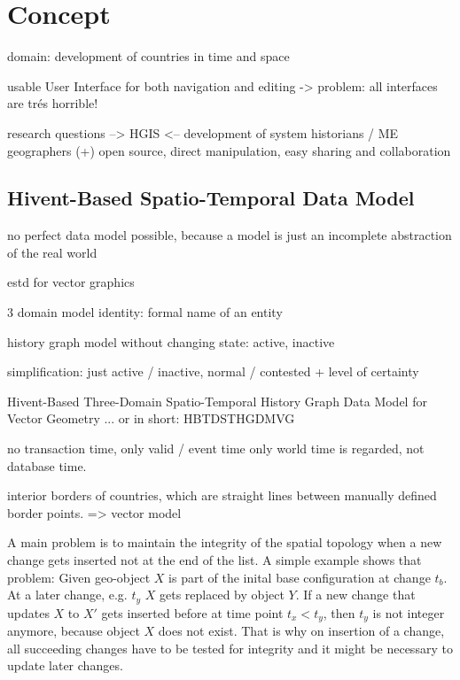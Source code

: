 
\chapter{Concept} %
\label{cha:concept}

domain: development of countries in time and space

usable User Interface for both navigation and editing
-> problem: all interfaces are trés horrible!

research questions --> HGIS <-- development of system
  historians /                           ME
  geographers
(+) open source, direct manipulation, easy sharing and collaboration



\section{Hivent-Based Spatio-Temporal Data Model} %
\label{sec:hivent_based_spatio_temporal_data_model}

no perfect data model possible, because a model is just an incomplete abstraction of the real world

estd for vector graphics

3 domain model
identity: formal name of an entity

history graph model without changing state: active, inactive

simplification: just active / inactive, normal / contested + level of certainty

Hivent-Based Three-Domain Spatio-Temporal History Graph Data Model for Vector Geometry
... or in short: HBTDSTHGDMVG

no transaction time, only valid / event time
only world time is regarded, not database time.


interior borders of countries, which are straight lines between manually defined border points.
=> vector model

A main problem is to maintain the integrity of the spatial topology when a new change gets inserted not at the end of the list. A simple example shows that problem: Given geo-object $X$ is part of the inital base configuration at change $t_b$. At a later change, e.g. $t_y$ $X$ gets replaced by object $Y$. If a new change that updates $X$ to $X'$ gets inserted before at time point $t_x < t_y$, then $t_y$ is not integer anymore, because object $X$ does not exist. That is why on insertion of a change, all succeeding changes have to be tested for integrity and it might be necessary to update later changes.

